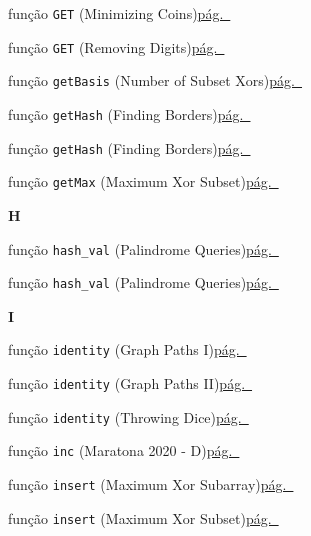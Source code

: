 \documentclass[10pt, a4paper, twocolumn, landscape]{article}
\begin{document}
{\noindent função \texttt{GET} {\scriptsize\color{codegray}(Minimizing Coins)}\dotfill\hyperref[fn9]{pág.~\pageref*{fn9}}\par
\noindent função \texttt{GET} {\scriptsize\color{codegray}(Removing Digits)}\dotfill\hyperref[fn12]{pág.~\pageref*{fn12}}\par
\noindent função \texttt{getBasis} {\scriptsize\color{codegray}(Number of Subset Xors)}\dotfill\hyperref[fn71]{pág.~\pageref*{fn71}}\par
\noindent função \texttt{getHash} {\scriptsize\color{codegray}(Finding Borders)}\dotfill\hyperref[fn31]{pág.~\pageref*{fn31}}\par
\noindent função \texttt{getHash} {\scriptsize\color{codegray}(Finding Borders)}\dotfill\hyperref[fn32]{pág.~\pageref*{fn32}}\par
\noindent função \texttt{getMax} {\scriptsize\color{codegray}(Maximum Xor Subset)}\dotfill\hyperref[fn69]{pág.~\pageref*{fn69}}\par
\par\medskip\textbf{\large H}\par
\noindent função \texttt{hash\_val} {\scriptsize\color{codegray}(Palindrome Queries)}\dotfill\hyperref[fn58]{pág.~\pageref*{fn58}}\par
\noindent função \texttt{hash\_val} {\scriptsize\color{codegray}(Palindrome Queries)}\dotfill\hyperref[fn60]{pág.~\pageref*{fn60}}\par
\par\medskip\textbf{\large I}\par
\noindent função \texttt{identity} {\scriptsize\color{codegray}(Graph Paths I)}\dotfill\hyperref[fn26]{pág.~\pageref*{fn26}}\par
\noindent função \texttt{identity} {\scriptsize\color{codegray}(Graph Paths II)}\dotfill\hyperref[fn27]{pág.~\pageref*{fn27}}\par
\noindent função \texttt{identity} {\scriptsize\color{codegray}(Throwing Dice)}\dotfill\hyperref[fn6]{pág.~\pageref*{fn6}}\par
\noindent função \texttt{inc} {\scriptsize\color{codegray}(Maratona 2020 - D)}\dotfill\hyperref[fn87]{pág.~\pageref*{fn87}}\par
\noindent função \texttt{insert} {\scriptsize\color{codegray}(Maximum Xor Subarray)}\dotfill\hyperref[fn14]{pág.~\pageref*{fn14}}\par
\noindent função \texttt{insert} {\scriptsize\color{codegray}(Maximum Xor Subset)}\dotfill\hyperref[fn68]{pág.~\pageref*{fn68}}\par
}
\end{document}
